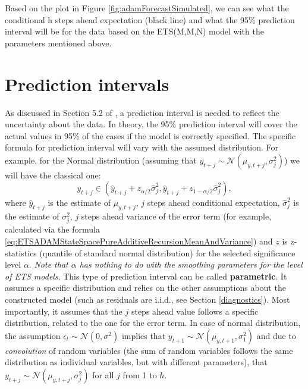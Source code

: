 \documentclass[
]{book}
\theoremstyle{definition}
\theoremstyle{definition}
\theoremstyle{definition}
\theoremstyle{definition}
\theoremstyle{remark}
\begin{document}
Based on the plot in Figure \ref{fig:adamForecastSimulated}, we can see what the conditional h steps ahead expectation (black line) and what the 95\% prediction interval will be for the data based on the ETS(M,M,N) model with the parameters mentioned above.

\hypertarget{ADAMForecastingPI}{%
\section{Prediction intervals}\label{ADAMForecastingPI}}

As discussed in Section 5.2 of \citet{SvetunkovSBA}, a prediction interval is needed to reflect the uncertainty about the data. In theory, the 95\% prediction interval will cover the actual values in 95\% of the cases if the model is correctly specified. The specific formula for prediction interval will vary with the assumed distribution. For example, for the Normal distribution (assuming that \(y_{t+j} \sim \mathcal{N}(\mu_{y, t+j}, \sigma_j^2)\)) we will have the classical one:
\begin{equation}
    y_{t+j} \in (\hat{y}_{t+j} + z_{\alpha/2} \hat{\sigma}_j^2, \hat{y}_{t+j} + z_{1-\alpha/2} \hat{\sigma}_j^2),
    \label{eq:predictionInterval}
\end{equation}
where \(\hat{y}_{t+j}\) is the estimate of \(\mu_{y,t+j}\), \(j\) steps ahead conditional expectation, \(\hat{\sigma}_j^2\) is the estimate of \({\sigma}_j^2\), \(j\) steps ahead variance of the error term (for example, calculated via the formula \eqref{eq:ETSADAMStateSpacePureAdditiveRecursionMeanAndVariance}) and \(z\) is z-statistics (quantile of standard normal distribution) for the selected significance level \(\alpha\). \emph{Note that \(\alpha\) has nothing to do with the smoothing parameters for the level of ETS models}. This type of prediction interval can be called \textbf{parametric}. It assumes a specific distribution and relies on the other assumptions about the constructed model (such as residuals are i.i.d., see Section \ref{diagnostics}). Most importantly, it assumes that the \(j\) steps ahead value follows a specific distribution, related to the one for the error term. In case of normal distribution, the assumption \(\epsilon_t\sim\mathcal{N}(0,\sigma^2)\) implies that \(y_{t+1}\sim\mathcal{N}(\mu_{y,t+1}, \sigma_1^2)\) and due to \emph{convolution} of random variables (the sum of random variables follows the same distribution as individual variables, but with different parameters), that \(y_{t+j}\sim\mathcal{N}(\mu_{y,t+j},\sigma_j^2)\) for all \(j\) from 1 to \(h\).
\end{document}
